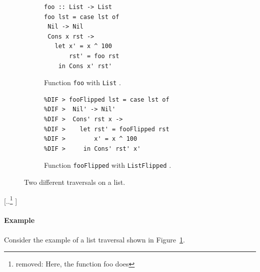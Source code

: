 \documentclass[acmsmall,review,anonymous]{acmart}\settopmatter{printfolios=true,printccs=false,printacmref=false}
\providecommand{\DIFaddtex}[1]{{\protect\color{blue} \sf #1}} %
\providecommand{\DIFdeltex}[1]{{\protect\color{red} [..\footnote{removed: #1} ]}} %
\providecommand{\DIFaddbegin}{} %
\providecommand{\DIFaddend}{} %
\providecommand{\DIFdelbegin}{} %
\providecommand{\DIFdelend}{} %
\providecommand{\DIFmodbegin}{} %
\providecommand{\DIFmodend}{} %
\providecommand{\DIFaddFL}[1]{\DIFadd{#1}} %
\providecommand{\DIFaddbeginFL}{} %
\providecommand{\DIFaddendFL}{} %
\providecommand{\DIFadd}[1]{\texorpdfstring{\DIFaddtex{#1}}{#1}} %
\providecommand{\DIFdel}[1]{\texorpdfstring{\DIFdeltex{#1}}{}} %
\newcommand{\DIFscaledelfig}{0.5}
\newlength{\DIFdelgraphicswidth} %
\newlength{\DIFdelgraphicsheight} %
\newcommand{\DIFaddincludegraphics}[2][]{{\color{blue}\fbox{\DIFOincludegraphics[#1]{#2}}}} %
\newcommand{\DIFdelincludegraphics}[2][]{%
\sbox{\DIFdelgraphicsbox}{\DIFOincludegraphics[#1]{#2}}%
\settoboxwidth{\DIFdelgraphicswidth}{\DIFdelgraphicsbox} %
\settoboxtotalheight{\DIFdelgraphicsheight}{\DIFdelgraphicsbox} %
\scalebox{\DIFscaledelfig}{%
\parbox[b]{\DIFdelgraphicswidth}{\usebox{\DIFdelgraphicsbox}\\[-\baselineskip] \rule{\DIFdelgraphicswidth}{0em}}\llap{\resizebox{\DIFdelgraphicswidth}{\DIFdelgraphicsheight}{%
\setlength{\unitlength}{\DIFdelgraphicswidth}%
\begin{picture}(1,1)%
\thicklines\linethickness{2pt} %
{\color[rgb]{1,0,0}\put(0,0){\framebox(1,1){}}}%
{\color[rgb]{1,0,0}\put(0,0){\line( 1,1){1}}}%
{\color[rgb]{1,0,0}\put(0,1){\line(1,-1){1}}}%
\end{picture}%
}\hspace*{3pt}}} %
} %
\DeclareRobustCommand{\DIFaddbegin}{\DIFOaddbegin \let\includegraphics\DIFaddincludegraphics} %
\DeclareRobustCommand{\DIFaddend}{\DIFOaddend \let\includegraphics\DIFOincludegraphics} %
\DeclareRobustCommand{\DIFdelbegin}{\DIFOdelbegin \let\includegraphics\DIFdelincludegraphics} %
\DeclareRobustCommand{\DIFdelend}{\DIFOaddend \let\includegraphics\DIFOincludegraphics} %
\DeclareRobustCommand{\DIFaddbeginFL}{\DIFOaddbeginFL \let\includegraphics\DIFaddincludegraphics} %
\DeclareRobustCommand{\DIFaddendFL}{\DIFOaddendFL \let\includegraphics\DIFOincludegraphics} %
\begin{document}
\DIFaddbegin {}

\begin{figure}
\centering
\begin{subfigure}{.5\textwidth}
\DIFaddendFL \begin{lstlisting}
foo :: List -> List 
foo lst = case lst of 
 Nil -> Nil
 Cons x rst -> 
   let x' = x ^ 100 
       rst' = foo rst 
    in Cons x' rst'
\end{lstlisting}
\DIFaddbeginFL \caption{\DIFaddFL{Function }{\color{blue}%
\lstinline|foo| %
}%
\DIFaddFL{with }{\color{blue}%
\lstinline|List|%
}%
\DIFaddFL{.}}
\label{fig:foo}
\end{subfigure}\begin{subfigure}{.5\textwidth}
\centering
\DIFmodbegin
\begin{lstlisting}[alsolanguage=DIFcode]
%DIF > fooFlipped :: ListFlipped -> ListFlipped 
%DIF > fooFlipped lst = case lst of
%DIF >  Nil' -> Nil'
%DIF >  Cons' rst x -> 
%DIF >    let rst' = fooFlipped rst
%DIF >        x' = x ^ 100
%DIF >     in Cons' rst' x' 
\end{lstlisting}
\DIFmodend
\caption{\DIFaddFL{Function }{\color{blue}%
\lstinline|fooFlipped| %
}%
\DIFaddFL{with }{\color{blue}%
\lstinline|ListFlipped|%
}%
\DIFaddFL{.}}
\label{fig:fooFlipped}
\end{subfigure}
\caption{\DIFaddFL{Two different traversals on a list.}}
\label{fig:two-diff-traversals}
\end{figure}
\DIFaddend 

\DIFdelbegin \DIFdel{Here, the function foo does }\DIFdelend \DIFaddbegin \paragraph{\DIFadd{Example}}
\DIFadd{Consider the example of a list traversal shown in Figure~\ref{fig:foo}.
}
\end{document}
